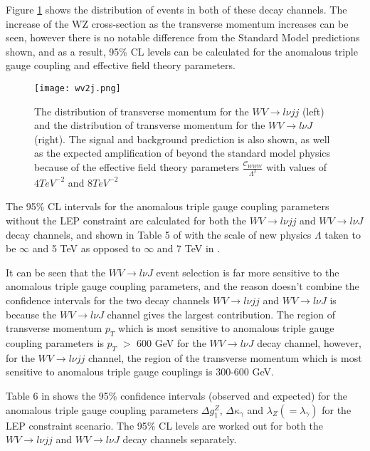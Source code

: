 \documentclass[11pt,oneside,a4paper]{article}
\begin{document}
Figure \ref{fig:lvatgc1} shows the distribution of events in both of these decay channels. The increase of the WZ cross-section as the transverse momentum increases can be seen, however there is no notable difference from the Standard Model predictions shown, and as a result, 95\% CL levels can be calculated for the anomalous triple gauge coupling and effective field theory parameters.


\begin{figure}[H]
\texttt{[image: wv2j.png]}
\caption{The distribution of transverse momentum for the $WV \rightarrow l\nu jj$ (left) and the distribution of transverse momentum for the $WV \rightarrow l\nu J$ (right). The signal and background prediction is also shown,  as well as the expected amplification of beyond the standard model physics because of the effective field theory parameters $\frac{\mathcal{C}_{WWW}}{\Lambda^{2}}$ with values of $4 TeV^{-2}$ and $8 TeV^{-2}$ }
\label{fig:lvatgc1}
\end{figure}

The 95\% CL intervals for the anomalous triple gauge coupling parameters without the LEP constraint are calculated for both the $WV \rightarrow l\nu jj$ and $WV \rightarrow l\nu J$ decay channels, and shown in Table 5 of \cite{WV} with the scale of new physics $\Lambda$ taken to be $\infty$ and 5 TeV as opposed to $\infty$ and 7 TeV in \cite{WWtgc}.

It can be seen that the $WV \rightarrow l\nu J$ event selection is far more sensitive to the anomalous triple gauge coupling parameters, and the reason \cite{WV} doesn't combine the confidence intervals for the two decay channels $WV \rightarrow l\nu jj$ and $WV \rightarrow l\nu J$ is because the $WV \rightarrow l\nu J$ channel gives the largest contribution. The region of transverse momentum $p_{T}$ which is most sensitive to anomalous triple gauge coupling parameters is $p_{T}$ $>$ 600 GeV for the $WV \rightarrow l\nu J$ decay channel, however, for the $WV \rightarrow l\nu jj$ channel, the region of the transverse momentum which is most sensitive to anomalous triple gauge couplings is 300-600 GeV. 
 

Table 6 in \cite{WV} shows the 95\% confidence intervals (observed and expected) for the anomalous triple gauge coupling parameters $\Delta g_{1}^{Z}$, $\Delta\kappa_{\gamma}$ and $\lambda_{Z} (=\lambda_{\gamma})$ for the LEP constraint scenario. The 95\% CL levels are worked out for both the $WV \rightarrow l\nu jj$ and $WV \rightarrow l\nu J$ decay channels separately.
\end{document}
